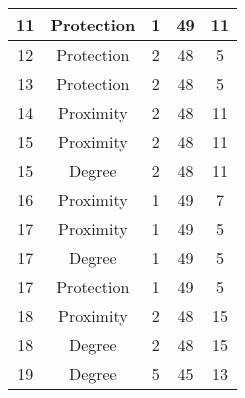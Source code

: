 \documentclass[results.tex]{subfiles}
\begin{document}
\begin{center}
\begin{tabular}{| c || c | c | c | c |}
            \hline
            11                      & Protection                   & 1                      & 49                      & 11                   \\
            \hline
            12                      & Protection                   & 2                      & 48                      & 5                    \\
            \hline
            13                      & Protection                   & 2                      & 48                      & 5                    \\
            \hline
            14                      & Proximity                    & 2                      & 48                      & 11                   \\
            \hline
            15                      & Proximity                    & 2                      & 48                      & 11                   \\
            \hline
            15                      & Degree                       & 2                      & 48                      & 11                   \\
            \hline
            16                      & Proximity                    & 1                      & 49                      & 7                    \\
            \hline
            17                      & Proximity                    & 1                      & 49                      & 5                    \\
            \hline
            17                      & Degree                       & 1                      & 49                      & 5                    \\
            \hline
            17                      & Protection                   & 1                      & 49                      & 5                    \\
            \hline
            18                      & Proximity                    & 2                      & 48                      & 15                   \\
            \hline
            18                      & Degree                       & 2                      & 48                      & 15                   \\
            \hline
            19                      & Degree                       & 5                      & 45                      & 13                   \\

\end{tabular}
\end{center}
\end{document}

